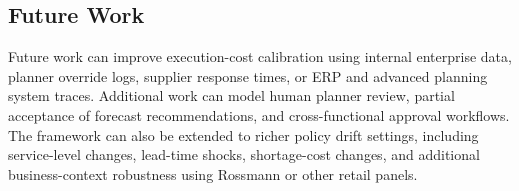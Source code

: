 \subsection{Future Work}

Future work can improve execution-cost calibration using internal enterprise data, planner override logs, supplier response times, or ERP and advanced planning system traces. Additional work can model human planner review, partial acceptance of forecast recommendations, and cross-functional approval workflows. The framework can also be extended to richer policy drift settings, including service-level changes, lead-time shocks, shortage-cost changes, and additional business-context robustness using Rossmann or other retail panels.
